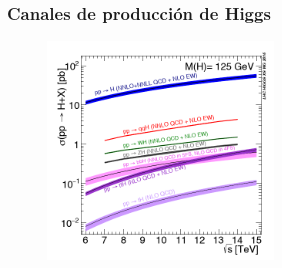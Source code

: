\documentclass[11pt]{beamer}
\begin{document}
\begin{frame}
\frametitle{Canales de producci\'on de Higgs}
\begin{center}
\begin{figure}
\includegraphics[width=6cm]{yuk.png}
\end{figure}
\end{center}
\end{frame}
\end{document}
